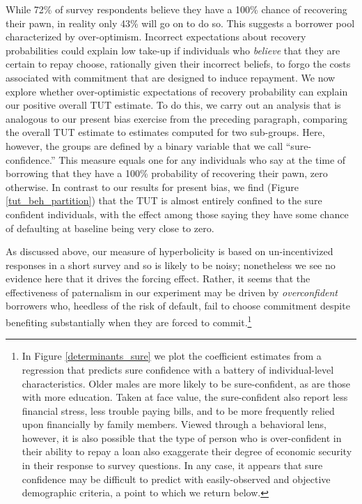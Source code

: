 \documentclass[12pt, a4paper]{article}
\begin{document}
While 72\% of survey respondents believe they have a 100\% chance of recovering their pawn, in reality only 43\% will go on to do so.  
This suggests a borrower pool characterized by over-optimism.
Incorrect expectations about recovery probabilities could explain low take-up if individuals who \emph{believe} that they are certain to repay choose, rationally given their incorrect beliefs, to forgo the costs associated with commitment that are designed to induce repayment. 
We now explore whether over-optimistic expectations of recovery probability can explain our positive overall TUT estimate.
To do this, we carry out an analysis that is analogous to our present bias exercise from the preceding paragraph, comparing the overall TUT estimate to estimates computed for two sub-groups.
Here, however, the groups are defined by a binary variable that we call ``sure-confidence.''
This measure equals one for any individuals who say at the time of borrowing that they have a 100\% probability of recovering their pawn, zero otherwise.
In contrast to our results for present bias, we find (Figure \ref{tut_beh_partition}) that the TUT is almost entirely confined to the sure confident individuals, with the effect among those saying they have some chance of defaulting at baseline being very close to zero.  

As discussed above, our measure of hyperbolicity is based on un-incentivized responses in a short survey and so is likely to be noisy; nonetheless we see no evidence here that it drives the forcing effect.  Rather, it seems that the effectiveness of paternalism in our experiment may be driven by \emph{overconfident} borrowers who, heedless of the risk of default, fail to choose commitment despite benefiting substantially when they are forced to commit.\footnote{In Figure \ref{determinants_sure} we plot the coefficient estimates from a regression that predicts sure confidence with a battery of individual-level characteristics.  Older males are more likely to be sure-confident, as are those with more education.  Taken at face value, the sure-confident also report less financial stress, less trouble paying bills, and to be more frequently relied upon financially by family members.  Viewed through a behavioral lens, however, it is also possible that the type of person who is over-confident in their ability to repay a loan also exaggerate their degree of economic security in their response to survey questions. In any case, it appears that sure confidence may be difficult to predict with easily-observed and objective demographic criteria, a point to which we return below.}
\end{document}
